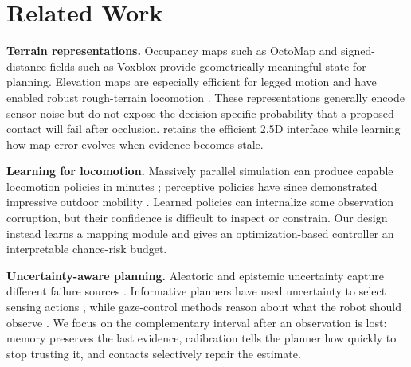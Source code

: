 \section{Related Work}

\textbf{Terrain representations.}
Occupancy maps such as OctoMap \cite{hornung2013octomap} and signed-distance fields such as
Voxblox \cite{oleynikova2017voxblox} provide geometrically meaningful state for planning.
Elevation maps are especially efficient for legged motion and have enabled robust
rough-terrain locomotion \cite{fankhauser2018rough}. These representations generally encode
sensor noise but do not expose the decision-specific probability that a proposed contact
will fail after occlusion. \method{} retains the efficient $2.5$D interface while learning
how map error evolves when evidence becomes stale.

\textbf{Learning for locomotion.}
Massively parallel simulation can produce capable locomotion policies in minutes
\cite{rudin2022minutes}; perceptive policies have since demonstrated impressive outdoor
mobility \cite{miki2022wild}. Learned policies can internalize some observation corruption,
but their confidence is difficult to inspect or constrain. Our design instead learns a
mapping module and gives an optimization-based controller an interpretable chance-risk
budget.

\textbf{Uncertainty-aware planning.}
Aleatoric and epistemic uncertainty capture different failure sources
\cite{kendall2017uncertainty}. Informative planners have used uncertainty to select sensing
actions \cite{schmid2020approach}, while gaze-control methods reason about what the robot
should observe \cite{wellhausen2020terrain}. We focus on the complementary interval after
an observation is lost: memory preserves the last evidence, calibration tells the planner
how quickly to stop trusting it, and contacts selectively repair the estimate.
